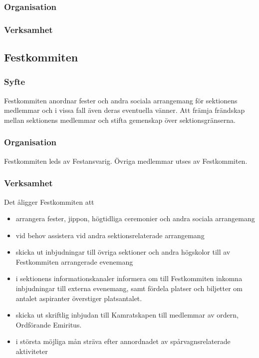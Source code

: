 \documentclass{../resources/dgovdoc}
\begin{document}
\subsubsection{Organisation}

\subsubsection{Verksamhet}

\subsection{Festkommiten}

\subsubsection{Syfte}

Festkommiten anordnar fester och andra sociala arrangemang för sektionens medlemmar och i vissa fall även deras eventuella vänner. Att främja frändskap mellan sektionens medlemmar och stifta gemenskap över sektionsgränserna. 

\subsubsection{Organisation}

Festkommiten leds av Festansvarig. Övriga medlemmar utses av Festkommiten. 

\subsubsection{Verksamhet}

Det åligger Festkommiten att

\begin{itemize}
\item arrangera fester, jippon, högtidliga ceremonier och andra sociala arrangemang
\item vid behov assistera vid andra sektionsrelaterade arrangemang
\item skicka ut inbjudningar till övriga sektioner och andra högskolor till av Festkommiten arrangerade evenemang
\item i sektionens informationskanaler informera om till Festkommiten inkomna inbjudningar till externa evenemang, samt fördela platser och biljetter om antalet aspiranter överstiger platsantalet. 
\item skicka ut skriftlig inbjudan till Kamratskapen till medlemmar av ordern, Ordförande Emiritus. 
\item i största möjliga mån sträva efter annordnadet av spårvagnsrelaterade aktiviteter
\end{itemize}
\end{document}
